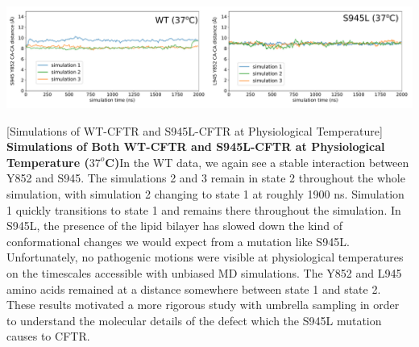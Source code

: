 \begin{center}
	\includegraphics[width=\textwidth]{figures/S945L/310K_supp.pdf}
\end{center}
\captionsetup{singlelinecheck = false, justification=raggedright}
\begingroup
{}[Simulations of WT-CFTR and S945L-CFTR at Physiological Temperature] {\textbf{Simulations of Both WT-CFTR and S945L-CFTR at Physiological Temperature ($37^o$C)}}{In the WT data, we again see a stable interaction between Y852 and S945. The simulations 2 and 3 remain in state 2 throughout the whole simulation, with simulation 2 changing to state 1 at roughly 1900 ns. Simulation 1 quickly transitions to state 1 and remains there throughout the simulation. In S945L, the presence of the lipid bilayer has slowed down the kind of conformational changes we would expect from a mutation like S945L. Unfortunately, no pathogenic motions were visible at physiological temperatures on the timescales accessible with unbiased MD simulations. The Y852 and L945 amino acids remained at a distance somewhere between state 1 and state 2. These results motivated a more rigorous study with umbrella sampling in order to understand the molecular details of the defect which the S945L mutation causes to CFTR. }
\label{S945L_MD_S2}
\endgroup

